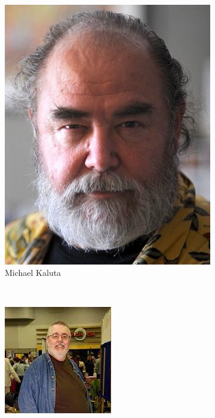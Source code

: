 \begin{frame}{}
\begin{figure}[htp]
\begin{subfigure}[b]{0.17\textwidth}
   \includegraphics[width=\textwidth]{img/artistas/MichaelKaluta}
   \caption{Michael Kaluta}
 \end{subfigure}
~
 \begin{subfigure}[b]{0.17\textwidth}
   \includegraphics[width=\textwidth]{img/artistas/KurtBusiek}

\end{subfigure}
\end{figure}
\end{frame}

